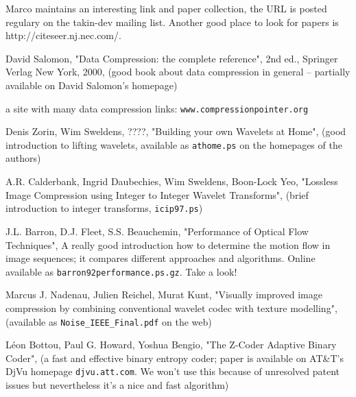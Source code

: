 
Marco maintains an interesting link and paper collection, the URL is posted
regulary on the takin-dev mailing list.
Another good place to look for papers is http://citeseer.nj.nec.com/.

\begin{thebibliography}{888}

David Salomon, "Data Compression: the complete reference", 2nd ed., 
Springer Verlag New York, 2000,
(good book about data compression in general -- partially available on David Salomon's homepage)


a site with many data compression links: \verb|www.compressionpointer.org|


Denis Zorin, Wim Sweldens, ????,
"Building your own Wavelets at Home", 
(good introduction to lifting wavelets, available as \verb|athome.ps| on the homepages of the authors)


A.R. Calderbank, Ingrid Daubechies, Wim Sweldens, Boon-Lock Yeo,
"Lossless Image Compression using Integer to Integer Wavelet Transforms",
(brief introduction to integer transforms, \verb|icip97.ps|)

J.L. Barron, D.J. Fleet, S.S. Beauchemin,
"Performance of Optical Flow Techniques",
A really good introduction how to determine the motion flow in image sequences;
it compares different approaches and algorithms. Online available as 
\verb|barron92performance.ps.gz|.
Take a look!


Marcus J. Nadenau, Julien Reichel, Murat Kunt,
"Visually improved image compression by combining conventional wavelet codec 
with texture modelling",
(available as \verb|Noise_IEEE_Final.pdf| on the web)


L\'eon Bottou, Paul G. Howard, Yoshua Bengio,
"The Z-Coder Adaptive Binary Coder",
(a fast and effective binary entropy coder; paper is available on AT\&T's 
DjVu homepage \verb|djvu.att.com|. We won't use this because of unresolved
patent issues but nevertheless it's a nice and fast algorithm)

\end{thebibliography}
